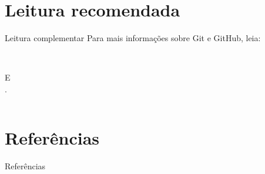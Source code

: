 \documentclass{beamer}
\begin{document}
\section{Leitura recomendada}
\begin{frame}{Leitura complementar}
 Para mais informações sobre Git e GitHub, leia:\\
  \vspace{0.6cm}
 \begin{columns}
   \begin{column}{0.4\textwidth}
 \cite{githubpages2022}\\
 E\\
 \cite{beer2015github}.
   \end{column}
   \begin{column}{0.4\textwidth}
   \end{column}

 \end{columns}
\end{frame}

\section{Referências}

\begin{frame}{Referências}%
\small
\begin{center}
\tiny


\end{center}
\end{frame}
\end{document}
